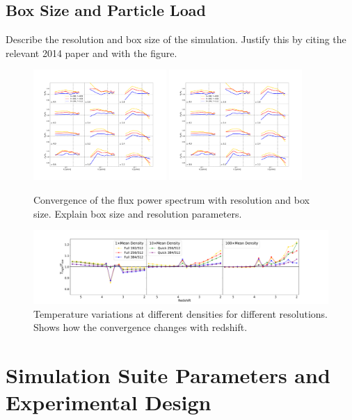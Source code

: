 \documentclass[a4paper,11pt]{article}
\begin{document}
\subsection{Box Size and Particle Load}

Describe the resolution and box size of the simulation. Justify this by citing the relevant 2014 paper and with the figure.

\begin{figure}
\includegraphics[width=0.45\textwidth]{figures/fps_mfr.pdf}
\includegraphics[width=0.45\textwidth]{figures/fps_mfr.pdf}
 \caption{Convergence of the flux power spectrum with resolution and box size. Explain box size and resolution parameters.}
 \label{fig:resolution}
\end{figure}


\begin{figure}
\includegraphics[width=1.\textwidth]{figures/comp-temps_fq.pdf}
 \caption{Temperature variations at different densities for different resolutions. Shows how the convergence changes with redshift.}
 \label{fig:resolutiontemp}
\end{figure}

\section{Simulation Suite Parameters and Experimental Design}
\end{document}

